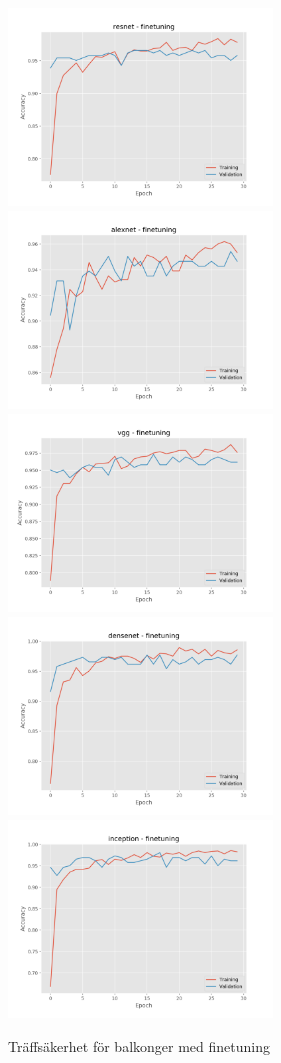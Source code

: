 \documentclass[]{kththesis}
\begin{document}
  \begin{figure}[h]
    \includegraphics[width=7cm]{b_a_resnet_fine}
    \includegraphics[width=7cm]{b_a_alexnet_fine}
    \includegraphics[width=7cm]{b_a_vgg_fine}
    \includegraphics[width=7cm]{b_a_densenet_fine}
    \includegraphics[width=7cm]{b_a_inception_fine}
    \caption{Träffsäkerhet för balkonger med finetuning}
    \label{fig:b_a_2}
  \end{figure}
\end{document}
